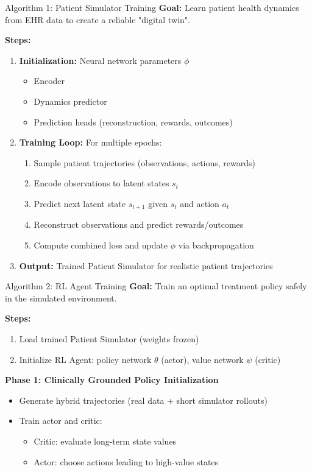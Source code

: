 \documentclass[11pt]{beamer}
\begin{document}
\begin{frame}{Algorithm 1: Patient Simulator Training}
\textbf{Goal:} Learn patient health dynamics from EHR data to create a reliable "digital twin".  

\textbf{Steps:}
\begin{enumerate}
    \item \textbf{Initialization:} Neural network parameters $\phi$  
    \begin{itemize}
        \item Encoder
        \item Dynamics predictor
        \item Prediction heads (reconstruction, rewards, outcomes)
    \end{itemize}
    \item \textbf{Training Loop:} For multiple epochs:
    \begin{enumerate}
        \item Sample patient trajectories (observations, actions, rewards)
        \item Encode observations to latent states $s_t$
        \item Predict next latent state $s_{t+1}$ given $s_t$ and action $a_t$
        \item Reconstruct observations and predict rewards/outcomes
        \item Compute combined loss and update $\phi$ via backpropagation
    \end{enumerate}
    \item \textbf{Output:} Trained Patient Simulator for realistic patient trajectories
\end{enumerate}
\end{frame}

\begin{frame}{Algorithm 2: RL Agent Training}
\textbf{Goal:} Train an optimal treatment policy safely in the simulated environment.

\textbf{Steps:}
\begin{enumerate}
    \item Load trained Patient Simulator (weights frozen)
    \item Initialize RL Agent: policy network $\theta$ (actor), value network $\psi$ (critic)
\end{enumerate}

\textbf{Phase 1: Clinically Grounded Policy Initialization}  
\begin{itemize}
    \item Generate hybrid trajectories (real data + short simulator rollouts)
    \item Train actor and critic:
    \begin{itemize}
        \item Critic: evaluate long-term state values
        \item Actor: choose actions leading to high-value states
    \end{itemize}
\end{itemize}
\end{frame}
\end{document}
